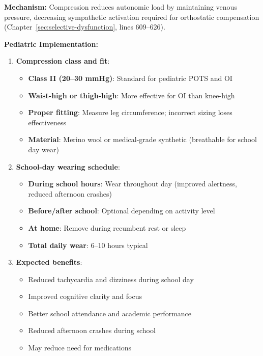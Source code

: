 \begin{recommendation}
\label{rec:compression-ped-ambulatory}

\textbf{Mechanism:} Compression reduces autonomic load by maintaining venous pressure, decreasing sympathetic activation required for orthostatic compensation (Chapter~\ref{sec:selective-dysfunction}, lines 609--626).

\textbf{Pediatric Implementation:}

\begin{enumerate}
    \item \textbf{Compression class and fit}:
    \begin{itemize}
        \item \textbf{Class II (20--30 mmHg)}: Standard for pediatric POTS and OI
        \item \textbf{Waist-high or thigh-high}: More effective for OI than knee-high
        \item \textbf{Proper fitting}: Measure leg circumference; incorrect sizing loses effectiveness
        \item \textbf{Material}: Merino wool or medical-grade synthetic (breathable for school day wear)
    \end{itemize}

    \item \textbf{School-day wearing schedule}:
    \begin{itemize}
        \item \textbf{During school hours}: Wear throughout day (improved alertness, reduced afternoon crashes)
        \item \textbf{Before/after school}: Optional depending on activity level
        \item \textbf{At home}: Remove during recumbent rest or sleep
        \item \textbf{Total daily wear}: 6--10 hours typical
    \end{itemize}

    \item \textbf{Expected benefits}:
    \begin{itemize}
        \item Reduced tachycardia and dizziness during school day
        \item Improved cognitive clarity and focus
        \item Better school attendance and academic performance
        \item Reduced afternoon crashes during school
        \item May reduce need for medications
    \end{itemize}


\end{enumerate}
\end{recommendation}
